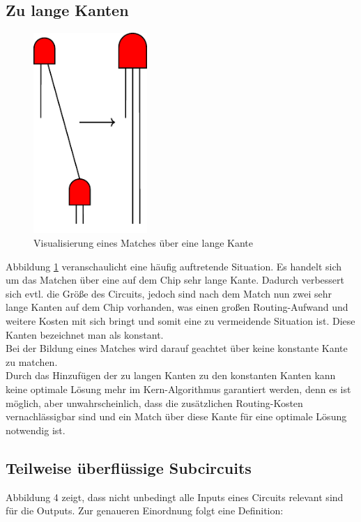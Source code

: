 \documentclass[11pt, a4paper, german]{article}
\begin{document}
\subsection{Zu lange Kanten}
\label{subsec:zu_lange_kanten}
 \begin{figure}
		\includegraphics[height = 7.6cm]{pictures/compiled/zu_lange_kante}
		\caption{Visualisierung eines Matches über eine lange Kante}
		\label{bild:zu_lange_kanten}
\end{figure}
Abbildung \ref{bild:zu_lange_kanten} veranschaulicht eine häufig auftretende Situation. Es handelt sich um das Matchen über eine auf dem Chip sehr lange Kante. Dadurch verbessert sich evtl. die Größe des Circuits, jedoch sind nach dem Match nun zwei sehr lange Kanten auf dem Chip vorhanden, was einen großen Routing-Aufwand und weitere Kosten mit sich bringt und somit eine zu vermeidende Situation ist. 
Diese Kanten bezeichnet man als konstant.\\
Bei der Bildung eines Matches wird darauf geachtet über keine konstante Kante zu matchen.\\
Durch das Hinzufügen der zu langen Kanten zu den konstanten Kanten kann keine optimale Lösung mehr im Kern-Algorithmus garantiert werden, denn es ist möglich, aber unwahrscheinlich, dass die zusätzlichen Routing-Kosten vernachlässigbar sind und ein Match über diese Kante für eine optimale Lösung notwendig ist. 

 \subsection{Teilweise überflüssige Subcircuits}
 \label{subsec:teilweise_ueberfkl_subcircuits}
 Abbildung 4 zeigt, dass nicht unbedingt alle Inputs eines Circuits relevant sind für die Outputs. Zur genaueren Einordnung folgt eine Definition:
 
\end{document}
